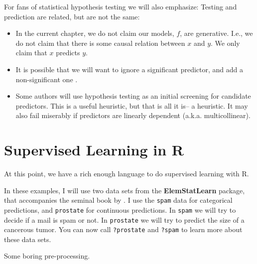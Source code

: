 \documentclass[]{book}
\providecommand{\tightlist}{%
  \setlength{\itemsep}{0pt}\setlength{\parskip}{0pt}}
\theoremstyle{definition}
\theoremstyle{definition}
\theoremstyle{definition}
\theoremstyle{remark}
\begin{document}
For fans of statistical hypothesis testing we will also emphasize:
Testing and prediction are related, but are not the same:

\begin{itemize}
\tightlist
\item
  In the current chapter, we do not claim our models, \(f\), are
  generative. I.e., we do not claim that there is some causal relation
  between \(x\) and \(y\). We only claim that \(x\) predicts \(y\).
\item
  It is possible that we will want to ignore a significant predictor,
  and add a non-significant one \citep{foster2004variable}.
\item
  Some authors will use hypothesis testing as an initial screening for
  candidate predictors. This is a useful heuristic, but that is all it
  is-- a heuristic. It may also fail miserably if predictors are
  linearly dependent (a.k.a. multicollinear).
\end{itemize}

\section{Supervised Learning in R}\label{supervised-learning-in-r}

At this point, we have a rich enough language to do supervised learning
with R.

In these examples, I will use two data sets from the
\textbf{ElemStatLearn} package, that accompanies the seminal book by
\citet{friedman2001elements}. I use the \texttt{spam} data for
categorical predictions, and \texttt{prostate} for continuous
predictions. In \texttt{spam} we will try to decide if a mail is spam or
not. In \texttt{prostate} we will try to predict the size of a cancerous
tumor. You can now call \texttt{?prostate} and \texttt{?spam} to learn
more about these data sets.

Some boring pre-processing.
\end{document}
